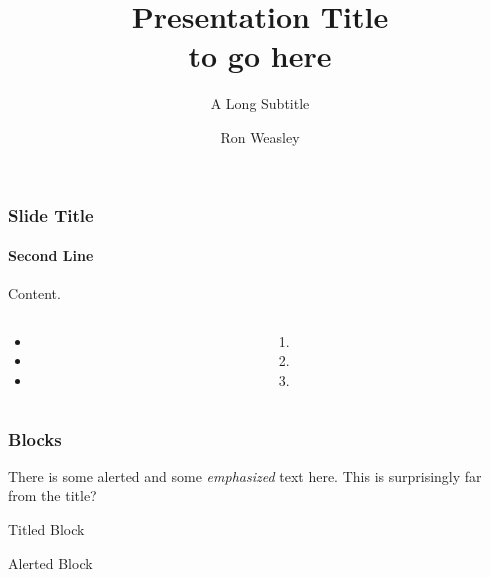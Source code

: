 \documentclass[aspectratio=169]{beamer}
\title{Presentation Title\\to go here}
\subtitle{A Long Subtitle}
\author{Ron Weasley}
\institute[Computer Science]{Liverpool}
\institute{Liverpool}
\begin{document}
%
%
\begin{frame}[colourprofile=Teal Green]
\maketitle
\end{frame}

\begin{frame}[t]
    \frametitle{Slide Title}
    \framesubtitle{Second Line}

    Content.
    \lipsum[1][1-2]

    \begin{columns}[T]
        \begin{column}{0.5\textwidth}
            \begin{itemize}
                \item \lipsum[1][2]
                \item \lipsum[2][2]
                \item \lipsum[3][2]
            \end{itemize}
        \end{column}

        \begin{column}{0.5\textwidth}
            \begin{enumerate}
                \item \lipsum[3][1]
                \item \lipsum[4][2]
                \item \lipsum[5][2]
            \end{enumerate}
        \end{column}
    \end{columns}
\end{frame}

\begin{frame}
\frametitle{Blocks}
There is some \alert{alerted} and some \emph{emphasized} text here. This is surprisingly far from the title?
\begin{block}{Titled Block}
    \lipsum[1][1-2] 
\end{block}
\begin{alertblock}{Alerted Block}
    \lipsum[1][1-2] 
\end{alertblock}
\begin{example}[Muggle]
\end{example}

\end{frame}
\end{document}
